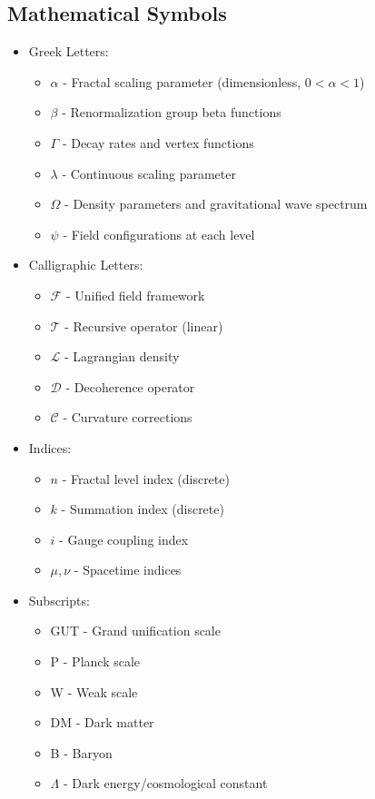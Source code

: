 \documentclass[12pt]{article}
\begin{document}
\subsection{Mathematical Symbols}
\begin{itemize}
  \item Greek Letters:
    \begin{itemize}
    \item $\alpha$ - Fractal scaling parameter (dimensionless, $0 < \alpha < 1$)
    \item $\beta$ - Renormalization group beta functions
    \item $\Gamma$ - Decay rates and vertex functions
    \item $\lambda$ - Continuous scaling parameter
    \item $\Omega$ - Density parameters and gravitational wave spectrum
    \item $\psi$ - Field configurations at each level
    \end{itemize}
  
  \item Calligraphic Letters:
    \begin{itemize}
    \item $\mathcal{F}$ - Unified field framework
    \item $\mathcal{T}$ - Recursive operator (linear)
    \item $\mathcal{L}$ - Lagrangian density
    \item $\mathcal{D}$ - Decoherence operator
    \item $\mathcal{C}$ - Curvature corrections
    \end{itemize}
  
  \item Indices:
    \begin{itemize}
    \item $n$ - Fractal level index (discrete)
    \item $k$ - Summation index (discrete)
    \item $i$ - Gauge coupling index
    \item $\mu, \nu$ - Spacetime indices
    \end{itemize}
  
  \item Subscripts:
    \begin{itemize}
    \item GUT - Grand unification scale
    \item P - Planck scale
    \item W - Weak scale
    \item DM - Dark matter
    \item B - Baryon
    \item $\Lambda$ - Dark energy/cosmological constant
    \end{itemize}
\end{itemize}
\end{document}
